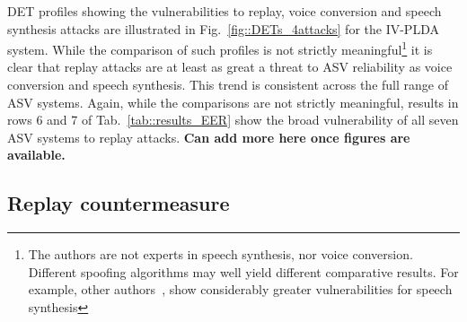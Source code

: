DET profiles showing the vulnerabilities to replay, voice conversion and speech synthesis attacks are illustrated in Fig.~\ref{fig::DETs_4attacks} for the IV-PLDA system.  While the comparison of such profiles is not strictly meaningful\footnote{The authors are not experts in speech synthesis, nor voice conversion.  Different spoofing algorithms may well yield different comparative results.  For example, other authors~\cite{yamagishi, wu , deleon}, show considerably greater vulnerabilities for speech synthesis} it is clear that replay attacks are at least as great a threat to ASV reliability as voice conversion and speech synthesis.  This trend is consistent across the full range of ASV systems.  Again, while the comparisons are not strictly meaningful, results in rows 6 and 7 of Tab.~\ref{tab::results_EER} show the broad vulnerability of all seven ASV systems to replay attacks. {\bfseries Can add more here once figures are available.}









\subsection{Replay countermeasure}


